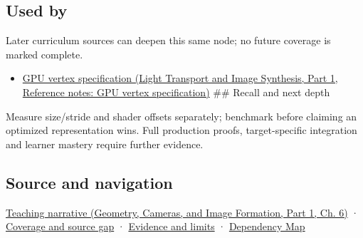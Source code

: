 \subsection{Used by}\label{appendix-26bf6bf2fb8b-used-by}

\hypertarget{appendix-26bf6bf2fb8b-used-by}{}

Later curriculum sources can deepen this same node; no future coverage is marked complete.

\begin{itemize}
\tightlist
\item
  \href{../04-Light-Transport-and-Image-Synthesis-P01/main.pdf\#appendix-749ba51a6c25}{GPU vertex specification (Light Transport and Image Synthesis, Part 1, Reference notes: GPU vertex specification)} \#\# Recall and next depth
\end{itemize}

Measure size/stride and shader offsets separately; benchmark before claiming an optimized representation wins. Full production proofs, target-specific integration and learner mastery require further evidence.

\subsection{Source and navigation}\label{appendix-26bf6bf2fb8b-source-and-navigation}

\hypertarget{appendix-26bf6bf2fb8b-source-and-navigation}{}

\href{../03-Geometry-Cameras-and-Image-Formation-P01/main.pdf\#02-foundations-ii-ch037-storage-and-computation-can-choose-different-layouts}{Teaching narrative (Geometry, Cameras, and Image Formation, Part 1, Ch. 6)} · \hyperref[appendix-fd090d982a15-phase-6---parts-501-600]{Coverage and source gap} · \hyperref[appendix-a103e7846d21-phase-6---source-analysis-and-verification]{Evidence and limits} · \hyperref[appendix-4ad47bdd269a]{Dependency Map}
